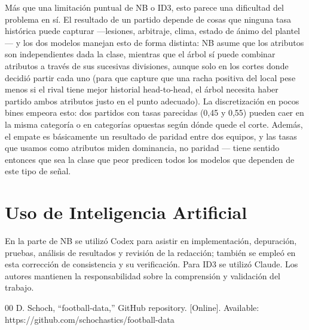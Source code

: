 \documentclass[conference]{IEEEtran}
\begin{document}
Más que una limitación puntual de NB o ID3, esto parece una dificultad del problema en sí. El resultado de un partido depende de cosas que ninguna tasa histórica puede capturar —lesiones, arbitraje, clima, estado de ánimo del plantel— y los dos modelos manejan esto de forma distinta: NB asume que los atributos son independientes dada la clase, mientras que el árbol sí puede combinar atributos a través de sus sucesivas divisiones, aunque solo en los cortes donde decidió partir cada uno (para que capture que una racha positiva del local pese menos si el rival tiene mejor historial head-to-head, el árbol necesita haber partido ambos atributos justo en el punto adecuado). La discretización en pocos bines empeora esto: dos partidos con tasas parecidas (0,45 y 0,55) pueden caer en la misma categoría o en categorías opuestas según dónde quede el corte. Además, el empate es básicamente un resultado de paridad entre dos equipos, y las tasas que usamos como atributos miden dominancia, no paridad — tiene sentido entonces que sea la clase que peor predicen todos los modelos que dependen de este tipo de señal.

\section*{Uso de Inteligencia Artificial}
En la parte de NB se utilizó Codex para asistir en implementación, depuración, pruebas, análisis de resultados y revisión de la redacción; también se empleó en esta corrección de consistencia y su verificación. Para ID3 se utilizó Claude. Los autores mantienen la responsabilidad sobre la comprensión y validación del trabajo.

\begin{thebibliography}{00}
 D. Schoch, ``football-data,'' GitHub repository. [Online]. Available: https://github.com/schochastics/football-data
\end{thebibliography}
\end{document}
